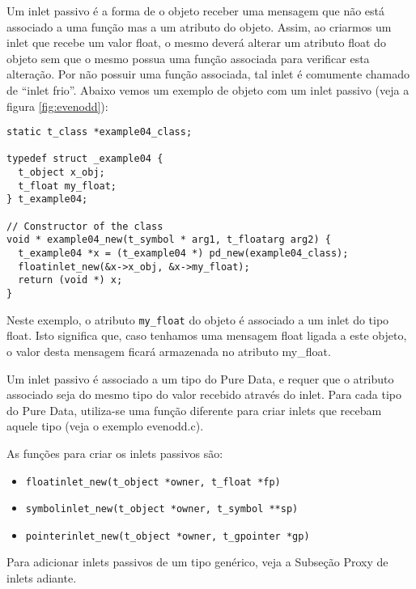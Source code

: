Um inlet passivo é a forma de o objeto receber uma mensagem que não está
associado a uma função mas a um atributo do objeto.
Assim, ao criarmos um inlet que recebe um valor float, o mesmo deverá alterar um
atributo float do objeto sem que o mesmo possua uma função associada para
verificar esta alteração.
Por não possuir uma função associada, tal inlet é comumente chamado de ``inlet
frio''.
Abaixo vemos um exemplo de objeto com um inlet passivo (veja a figura
\ref{fig:evenodd}):

\begin{lstlisting}[caption=Exemplo de inlet passivo]
static t_class *example04_class;

typedef struct _example04 {
  t_object x_obj;
  t_float my_float;
} t_example04;

// Constructor of the class
void * example04_new(t_symbol * arg1, t_floatarg arg2) {
  t_example04 *x = (t_example04 *) pd_new(example04_class);
  floatinlet_new(&x->x_obj, &x->my_float);
  return (void *) x;
}
\end{lstlisting}

Neste exemplo, o atributo \texttt{my\_float} do objeto é associado a um inlet do
tipo float.
Isto  significa que, caso tenhamos uma mensagem float ligada a este objeto, o valor
desta mensagem ficará armazenada no atributo my\_float.

Um inlet passivo é associado a um tipo do Pure Data, e requer que o atributo
associado seja do mesmo tipo do valor recebido através do inlet.
Para cada tipo do Pure Data, utiliza-se uma função diferente para criar inlets
que recebam aquele tipo (veja o exemplo evenodd.c).

As funções para criar os inlets passivos são:

\begin{itemize}
\item \texttt{floatinlet\_new(t\_object *owner, t\_float *fp)}
\item \texttt{symbolinlet\_new(t\_object *owner, t\_symbol **sp)}
\item \texttt{pointerinlet\_new(t\_object *owner, t\_gpointer *gp)}
\end{itemize}

Para adicionar inlets passivos de um tipo genérico, veja a Subseção Proxy de inlets
adiante.



